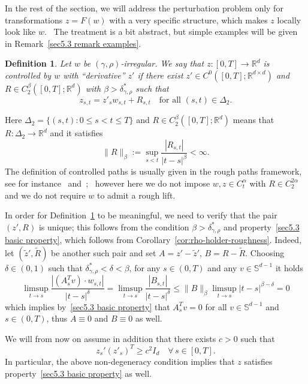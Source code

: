 \documentclass[10pt]{article}
\newcommand{\assign}{:=}
\newtheorem{definition}[theorem]{Definition}
\begin{document}
In the rest of the section, we will address the perturbation problem only for
transformations $z = F (w)$ with a very specific structure, which makes $z$
locally look like $w$. \ The treatment is a bit abstract, but simple examples
will be given in Remark~\ref{sec5.3 remark examples}.

\begin{definition}
  \label{sec5.3 defn controlled}Let $w$ be $(\gamma, \rho)$-irregular. We say
  that $z : [0, T] \rightarrow \mathbb{R}^d$ is controlled by $w$ with
  ``derivative'' $z'$ if there exist $z' \in C^0 ([0, T] ; \mathbb{R}^{d
  \times d})$ and $R \in C^{\beta}_2 ([0, T] ; \mathbb{R}^d)$ with $\beta >
  \delta^{\ast}_{\gamma, \rho}$ such that
  \[ z_{s, t} = z'_s w_{s, t} + R_{s, t} \quad \text{for all } (s, t) \in
     \Delta_2 . \]
\end{definition}

Here $\Delta_2 = \{ (s, t) : 0 \leqslant s < t \leqslant T \}$ and $R \in
C^{\beta}_2 ([0, T] ; \mathbb{R}^d)$ means that $R : \Delta_2 \rightarrow
\mathbb{R}^d$ and it satisfies
\[ \| R \|_{\beta} \assign \sup_{s < t} \frac{| R_{s, t} |}{| t - s |^{\beta}}
   < \infty . \]
The definition of controlled paths is usually given in the rough paths
framework, see for instance~{\cite{gubinelli}} and~{\cite{frizhairer}}; \
however here we do not impose $w, z \in C^{\alpha}_t$ with $R \in C_2^{2
\alpha}$ and we do not require $w$ to admit a rough lift.

In order for Definition~\ref{sec5.3 defn controlled} to be meaningful, we need
to verify that the pair $(z', R)$ is unique; this follows from the condition
$\beta > \delta^{\ast}_{\gamma, \rho}$ and property~\eqref{sec5.3 basic
property}, which follows from Corollary~\ref{cor:rho-holder-roughness}.
Indeed, let $(\tilde{z}', \tilde{R})$ be another such pair and set $A = z' -
\tilde{z}'$, $B = R - \tilde{R}$. Choosing $\delta \in (0, 1)$ such that
$\delta^{\ast}_{\gamma, \rho} < \delta < \beta$, for any $s \in (0, T)$ and
any $v \in \mathbb{S}^{d - 1}$ it holds
\[ \limsup_{t \rightarrow s} \frac{| (A_s^T v) \cdot w_{s, t} |}{| t - s
   |^{\delta}} = \limsup_{t \rightarrow s} \frac{| B_{s, t} |}{| t - s
   |^{\delta}} \leqslant \| B \|_{\beta} \limsup_{t \rightarrow s} | t - s
   |^{\beta - \delta} = 0 \]
which implies by~\eqref{sec5.3 basic property} that $A^T_s v = 0$ for all $v
\in \mathbb{S}^{d - 1}$ and $s \in (0, T)$, thus $A \equiv 0$ and $B \equiv 0$
as well.

We will from now on assume in addition that there exists $c > 0$ such that
\begin{equation}
  z_s'  (z'_s)^T \geqslant c^2 I_d \quad \forall \, s \in [0, T] .
  \label{sec5.3 nondegeneracy}
\end{equation}
In particular, the above non-degeneracy condition implies that $z$ satisfies
property~\eqref{sec5.3 basic property} as well.
\end{document}
